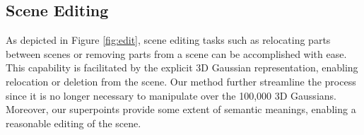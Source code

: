 \subsection{Scene Editing}
As depicted in Figure \ref{fig:edit}, scene editing tasks such as relocating parts between scenes or removing parts from a scene can be accomplished with ease. 
This capability is facilitated by the explicit 3D Gaussian representation, enabling relocation or deletion from the scene.
Our method further streamline the process since it is no longer necessary to manipulate over the 100,000 3D Gaussians. Moreover, our superpoints provide some extent of semantic meanings, enabling a reasonable editing of the scene.
